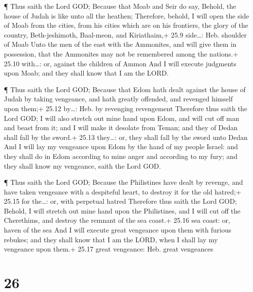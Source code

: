  ¶ Thus saith the Lord GOD; Because that Moab and Seir do
say, Behold, the house of Judah is like unto all the heathen;
 Therefore, behold, I will open the side of Moab from the
cities, from his cities which are on his frontiers, the glory of the
country, Beth-jeshimoth, Baal-meon, and Kiriathaim,+ 25.9 side\ldots:
Heb. shoulder of Moab  Unto the men of the east with the
Ammonites, and will give them in possession, that the Ammonites may not
be remembered among the nations.+ 25.10 with\ldots: or, against the
children of Ammon  And I will execute judgments upon Moab;
and they shall know that I am the LORD.

 ¶ Thus saith the Lord GOD; Because that Edom hath dealt
against the house of Judah by taking vengeance, and hath greatly
offended, and revenged himself upon them;+ 25.12 by\ldots: Heb. by
revenging revengement  Therefore thus saith the Lord GOD; I
will also stretch out mine hand upon Edom, and will cut off man and
beast from it; and I will make it desolate from Teman; and they of Dedan
shall fall by the sword.+ 25.13 they\ldots: or, they shall fall by the
sword unto Dedan  And I will lay my vengeance upon Edom by
the hand of my people Israel: and they shall do in Edom according to
mine anger and according to my fury; and they shall know my vengeance,
saith the Lord GOD.

 ¶ Thus saith the Lord GOD; Because the Philistines have
dealt by revenge, and have taken vengeance with a despiteful heart, to
destroy it for the old hatred;+ 25.15 for the\ldots: or, with perpetual
hatred  Therefore thus saith the Lord GOD; Behold, I will
stretch out mine hand upon the Philistines, and I will cut off the
Cherethims, and destroy the remnant of the sea coast.+ 25.16 sea coast:
or, haven of the sea  And I will execute great vengeance
upon them with furious rebukes; and they shall know that I am the LORD,
when I shall lay my vengeance upon them.+ 25.17 great vengeance: Heb.
great vengeances

\hypertarget{section-25}{%
\section{26}\label{section-25}}


